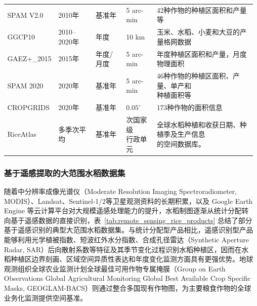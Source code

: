 \begin{longtable}{@{}m{}%
    m{}m{}m{}m{}@{}}
SPAM V2.0\cite{Yu2020SPAM}
& %
2010年
& 基准年
& 5 arc-min
& 42种作物的种植区面积和产量等 \\

GGCP10\cite{Qin2024GGCP10}
& %
2010--2020年
& 年度
& 10 km
& 玉米、水稻、小麦和大豆的产量格网数据
\\

GAEZ+\_2015\cite{Grogan2022GAEZ}
& %
2015年
& 年度/月度
& 5 arc-min
& 年度种植区面积和产量，月度物理面积
\\

SPAM 2020\cite{IFPRI2026SPAM2020}
& %
2020年
& 基准年
& 5 arc-min
& \makecell[l]{46种作物的种植区面积、产量、单产和\\[-3pt] 种植面积等} \\

CROPGRIDS\cite{Tang2024CROPGRIDS}
& %
2020年
& 基准年
& $0.05^\circ$
& 173种作物的面积信息 \\

RiceAtlas\cite{Laborte2017SciData}
& %
多季次平均
& 基准年
& \makecell[l]{次国家级\\[-3pt] 行政单元}
& \makecell[l]{全球水稻种植和收获日期、种植季及生产信息\\[-3pt] 的空间数据库。} \\

\end{longtable}
\endgroup

\clearpage

\subsubsection{基于遥感提取的大范围水稻数据集}

随着中分辨率成像光谱仪（Moderate Resolution Imaging Spectroradiometer, MODIS）、Landsat、Sentinel-1/2等卫星观测资料的长期积累，以及 Google Earth Engine 等云计算平台对大规模遥感处理能力的提升，水稻制图逐渐从统计分配转向基于遥感数据的直接识别\cite{Gorelick2017GEE}，表~\ref{tab:remote_sensing_rice_products} 总结了部分基于遥感识别的典型大范围水稻数据集。与统计分配型产品相比，遥感识别型产品能够利用光学植被指数、短波红外水分指数、合成孔径雷达（Synthetic Aperture Radar, SAR）后向散射系数等特征及其季节变化过程识别水稻种植区，因而在水稻种植区边界刻画、区域空间异质性表达和年度变化监测方面具有更强优势\cite{Dong2016,Torbick2017}。地球观测组织全球农业监测计划全球最佳可用作物专属掩膜（Group on Earth Observations Global Agricultural Monitoring Global Best Available Crop Specific Masks, GEOGLAM-BACS）则通过整合多国现有作物图，为主要粮食作物的全球业务化监测提供空间基准\cite{BeckerReshef2023GEOGLAMBACS}。


